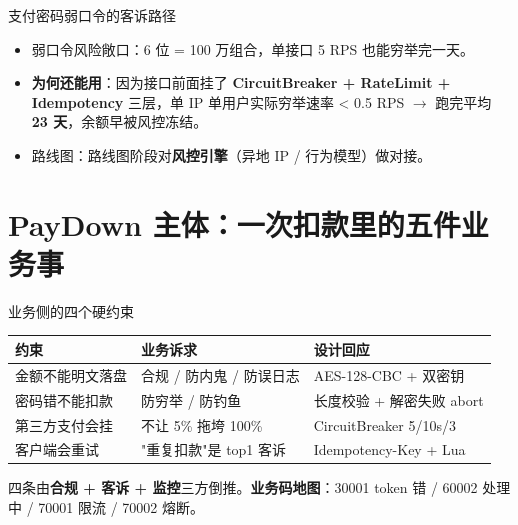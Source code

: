 \documentclass[aspectratio=169,11pt]{beamer}
\begin{document}
\begin{frame}[shrink]{支付密码弱口令的客诉路径}
\vspace{1mm}
\begin{itemize}\small
  \item 弱口令风险敞口：6 位 = 100 万组合，单接口 5 RPS 也能穷举完一天。
  \item \textbf{为何还能用}：因为接口前面挂了 \textbf{CircuitBreaker + RateLimit + Idempotency} 三层，单 IP 单用户实际穷举速率 < 0.5 RPS $\to$ 跑完平均 \textbf{23 天}，余额早被风控冻结。
  \item 路线图：路线图阶段对\textbf{风控引擎}（异地 IP / 行为模型）做对接。
\end{itemize}
\end{frame}

\section{PayDown 主体：一次扣款里的五件业务事}

\begin{frame}[shrink]{业务侧的四个硬约束}
\begin{tabular}{@{}lll@{}}
\toprule
约束 & 业务诉求 & 设计回应 \\
\midrule
金额不能明文落盘 & 合规 / 防内鬼 / 防误日志 & AES-128-CBC + 双密钥 \\
密码错不能扣款 & 防穷举 / 防钓鱼 & 长度校验 + 解密失败 abort \\
第三方支付会挂 & 不让 5\% 拖垮 100\% & CircuitBreaker 5/10s/3 \\
客户端会重试 & "重复扣款"是 top1 客诉 & Idempotency-Key + Lua \\
\bottomrule
\end{tabular}
\vspace{2mm}
\small 四条由\textbf{合规 + 客诉 + 监控}三方倒推。\textbf{业务码地图}：30001 token 错 / 60002 处理中 / 70001 限流 / 70002 熔断。
\end{frame}
\end{document}

